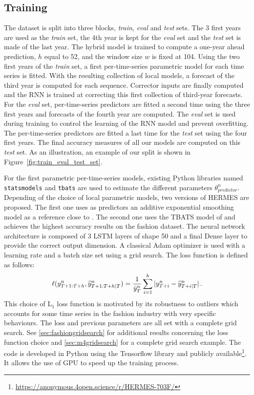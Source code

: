\documentclass[10pt]{article} %
\newcommand{\ts}{y}
\newcommand{\tspred}{\widehat{\ts}}
\newcommand{\statparam}{\theta_{predictor}}
\newcommand{\lag}{h}
\newcommand{\window}{w}
\newcommand{\meants}{\Bar{\ts}}
\begin{document}
\subsection{Training}
The dataset is split into three blocks, {\em train}, {\em eval} and {\em test} sets. The 3 first years are used as the {\em train} set, the 4th year is kept for the {\em eval} set and the {\em test} set is made of the last year. The hybrid model is trained to compute a one-year ahead prediction, $\lag$ equal to 52, and the window size $\window$ is fixed at 104.
Using the two first years of the {\em train} set, a first per-time-series parametric model for each time series is fitted. With the resulting collection of local models, a forecast of the third year is computed for each sequence. Corrector inputs are finally computed and the RNN is trained at correcting this first collection of third-year forecasts. For the {\em eval} set, per-time-series predictors are fitted a second time using the three first years and forecasts of the fourth year are computed. The {\em eval} set is used during  training to control the learning of the RNN model and prevent overfitting. The per-time-series predictors are fitted a last time for the {\em test} set using the four first years. The final accuracy measures of all our models are computed on this {\em test} set. As an illustration, an example of our split is shown in Figure~\ref{fig:train_eval_test_set}.

For the first parametric per-time-series models, existing Python  libraries named \texttt{statsmodels} and  \texttt{tbats} are used to estimate the different parameters $\statparam^n$.  Depending of the choice of local parametric models, two versions of HERMES are proposed. The first one uses as predictors an additive exponential smoothing model as a reference close to \citet{smyl2020}. The second one uses the TBATS model of \citet{alysha2011} and  achieves the highest accuracy results on the fashion dataset. The neural network architecture is composed of 3 LSTM layers of shape 50 and a final Dense layer to provide the correct output dimension. A classical Adam optimizer is used with a learning rate and a batch size set using a grid search. The loss function is defined as follows:
$$
\ell(\ts^n_{T+1:T+\lag},\tspred^n_{T+1:T+\lag|T}) = \frac{1}{\meants^n_T}\sum_{i=1}^{\lag}|\ts^n_{T+i} - \tspred^n_{T+i|T}|\,.
$$
This choice of $\mathrm{L}_1$ loss function is motivated by its robustness to outliers which accounts for some time series in the fashion industry with very specific behaviours. The loss and previous parameters are all set with a complete grid search. See \ref{sec:fashiongridsearch} for additional results concerning the loss function choice and \ref{sec:m4gridsearch} for a complete grid search example. The code is developed in Python using the Tensorflow library and publicly available\footnote[1]{\url{https://anonymous.4open.science/r/HERMES-703F/}}. It allows the use of GPU to speed up the training process.
\end{document}
